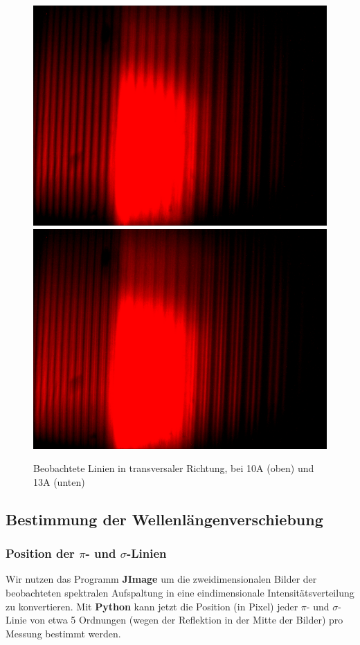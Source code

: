       \begin{figure}[H]
        \centering
        \includegraphics[width=.6\paperwidth,trim={0 600pt 0 500pt}, clip]{Auswertung/data/trans/10A/10A_l}
        \includegraphics[width=.6\paperwidth,trim={0 200pt 0 900pt}, clip]{Auswertung/data/trans/13A/13A_l}
        \caption{Beobachtete Linien in transversaler Richtung, bei 10A (oben) und 13A (unten)}
        \label{pic::4}
      \end{figure}

    \subsection{Bestimmung der Wellenlängenverschiebung}
      \subsubsection{Position der $\pi$- und $\sigma$-Linien}
        Wir nutzen das Programm \textbf{JImage} um die zweidimensionalen Bilder der beobachteten spektralen Aufspaltung in eine eindimensionale Intensitätsverteilung zu konvertieren. Mit \textbf{Python} kann jetzt die Position (in Pixel) jeder $\pi$- und $\sigma$-Linie von etwa 5 Ordnungen (wegen der Reflektion in der Mitte der Bilder) pro Messung bestimmt werden.

